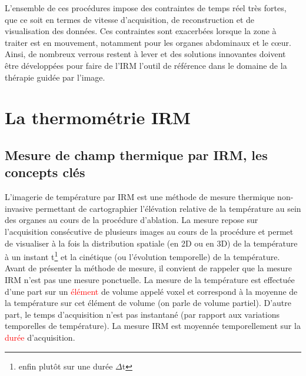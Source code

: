 L’ensemble de ces procédures impose des contraintes de temps réel très fortes, que ce soit en termes de vitesse d’acquisition, de reconstruction et de visualisation des données. Ces contraintes sont exacerbées lorsque la zone à traiter est en mouvement, notamment pour les organes abdominaux et le cœur. Ainsi, de nombreux verrous restent à lever et des solutions innovantes doivent être développées pour faire de l’IRM l’outil de référence dans le domaine de la thérapie guidée par l’image.

\section{La thermométrie IRM}
\label{chap1-thermometrie}

\subsection{Mesure de champ thermique par IRM, les concepts clés}

L'imagerie de température par IRM est une méthode de mesure thermique non-invasive permettant de cartographier l'élévation relative de la température au sein des organes au cours de la procédure d'ablation. La mesure repose sur l'acquisition consécutive de plusieurs images au cours de la procédure et permet de visualiser à la fois la distribution spatiale (en 2D ou en 3D) de la température à un instant t\footnote{enfin plutôt sur une durée $\Delta$t} et la cinétique (ou l'évolution temporelle) de la température. Avant de présenter la méthode de mesure, il convient de rappeler que la mesure IRM n'est pas une mesure ponctuelle. La mesure de la température est effectuée d'une part sur un \textcolor{red}{élément} de volume appelé voxel et correspond à la moyenne de la température sur cet élément de volume (on parle de volume partiel). D'autre part, le temps d'acquisition n'est pas instantané (par rapport aux variations temporelles de température). La mesure IRM est moyennée temporellement sur la \textcolor{red}{durée} d'acquisition. \\